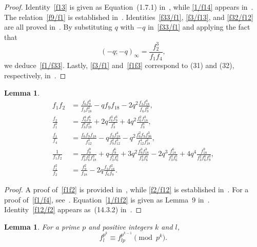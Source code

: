 \documentclass{amsart}
\newtheorem{lemma}[theorem]{Lemma}
\theoremstyle{definition}
\begin{document}
	\begin{proof}
		Identity~\eqref{f13} is given as Equation~(1.7.1) in~\cite{Hirschhorn}, while \eqref{1/f14} appears in~\cite{Brietzke-daSilva-Sellers}. The relation~\eqref{f9/f1} is established in~\cite[Lemma~3.5]{Xia-Yao}. Identities~\eqref{f33/f1}, \eqref{f3/f13}, and \eqref{f32/f12} are all proved in~\cite{Xia-Yao_2013}. By substituting $q$ with $-q$ in~\eqref{f33/f1} and applying the fact that
		\begin{equation}
			(-q;-q)_\infty = \frac{f_2^3}{f_1 f_4},
		\end{equation}
		we deduce~\eqref{f1/f33}. Lastly, \eqref{f3/f1} and~\eqref{f1f3} correspond to (31) and (32), respectively, in~\cite{daSilva-Sellers}.
	\end{proof}
   \begin{lemma}
		\begin{align}
			\label{f1f2}f_1f_2&=\frac{f_6f_9^4}{f_3f_{18}^2}-qf_9f_{18}-2q^2\frac{f_3f_{18}^4}{f_6f_9^2},\\
			\label{f2/f12}\frac{f_2}{f_1^2}&=\frac{f_6^4f_9^6}{f_3^8f_{18}^3}+2q\frac{f_6^3f_9^3}{f_3^7}+4q^2\frac{f_6^2f_{18}^3}{f_3^6},\\
			\label{f1/f4}\frac{f_1}{f_4}&=\frac{f_6f_9f_{18}}{f_{12}^3}-q\frac{f_3f_{18}^4}{f_9^2f_{12}^3}-q^2\frac{f_6^2f_9f_{36}^3}{f_{12}^4f_{18}^2},\\
			\label{1/f1f2}\frac{1}{f_1f_2}&=\frac{f_9^9}{f_3^6f_6^2f_{18}^3}+q\frac{f_9^6}{f_3^5f_6^3}+3q^2\frac{f_9^3f_{18}^3}{f_3^4f_6^4}-2q^3\frac{f_{18}^6}{f_3^3f_6^5}+4q^4\frac{f_{18}^9}{f_3^2f_6^6f_9^3},\\
			\label{f12/f2}\frac{f_1^2}{f_2}&=\frac{f_9^2}{f_{18}}-2q\frac{f_3f_{18}^2}{f_6f_9}.
		\end{align}
	\end{lemma}
	\begin{proof}
		A proof of~\eqref{f1f2} is provided in~\cite{Hirschhorn-Sellers_2014}, while \eqref{f2/f12} is established in~\cite{Hirschhorn-Sellers_2005}. For a proof of~\eqref{f1/f4}, see~\cite[Lemma~5.1]{Das-Maity-Saikia}. Equation~\eqref{1/f1f2} is given as Lemma~9 in~\cite{Sellers}. Identity~\eqref{f12/f2} appears as~(14.3.2) in~\cite{Hirschhorn}.
	\end{proof}
\begin{lemma}
    For a prime $p$ and positive integers $k$ and $l$,
    \begin{equation}\label{modp^k}
        f_l^{p^k}\equiv f_{lp}^{p^{k-1}}\pmod{p^k}.
    \end{equation}
\end{lemma}
\end{document}
